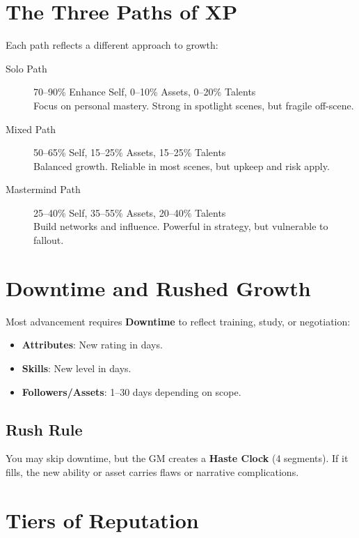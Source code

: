 \section{The Three Paths of XP}

Each path reflects a different approach to growth:

\begin{description}
  \item[Solo Path] 70–90\% Enhance Self, 0–10\% Assets, 0–20\% Talents \\
    Focus on personal mastery. Strong in spotlight scenes, but fragile off-scene.

  \item[Mixed Path] 50–65\% Self, 15–25\% Assets, 15–25\% Talents \\
    Balanced growth. Reliable in most scenes, but upkeep and risk apply.

  \item[Mastermind Path] 25–40\% Self, 35–55\% Assets, 20–40\% Talents \\
    Build networks and influence. Powerful in strategy, but vulnerable to fallout.
\end{description}

\section{Downtime and Rushed Growth}

Most advancement requires \textbf{Downtime} to reflect training, study, or negotiation:

\begin{itemize}
  \item \textbf{Attributes}: New rating in days.
  \item \textbf{Skills}: New level in days.
  \item \textbf{Followers/Assets}: 1–30 days depending on scope.
\end{itemize}

\subsection*{Rush Rule}

You may skip downtime, but the GM creates a \textbf{Haste Clock} (4 segments). If it fills, the new ability or asset carries flaws or narrative complications.

\section{Tiers of Reputation}


